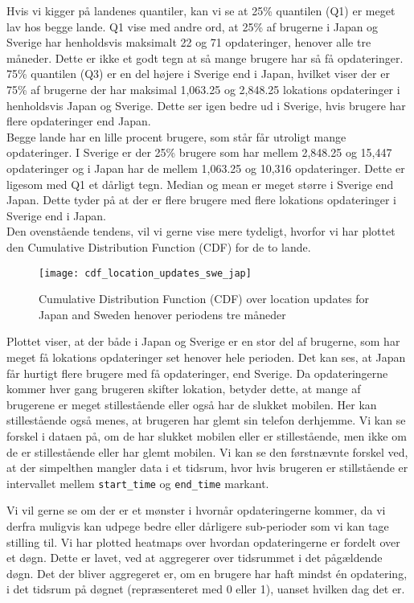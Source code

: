 Hvis vi kigger på landenes quantiler, kan vi se at 25\% quantilen (Q1) er meget lav hos begge lande. Q1 vise med andre ord, at 25\% af brugerne i Japan og Sverige har henholdsvis maksimalt 22 og 71 opdateringer, henover alle tre måneder. Dette er ikke et godt tegn at så mange brugere har så få opdateringer. 75\% quantilen (Q3) er en del højere i Sverige end i Japan, hvilket viser der er 75\% af brugerne der har maksimal 1,063.25 og 2,848.25 lokations opdateringer i henholdsvis Japan og Sverige. Dette ser igen bedre ud i Sverige, hvis brugere har flere opdateringer end Japan. \\ 

Begge lande har en lille procent brugere, som står får utroligt mange opdateringer. I Sverige er der 25\% brugere som har mellem 2,848.25 og 15,447 opdateringer og i Japan har de mellem 1,063.25 og 10,316 opdateringer. Dette er ligesom med Q1 et dårligt tegn. 
Median og mean er meget større i Sverige end Japan. Dette tyder på at der er flere brugere med flere lokations opdateringer i Sverige end i Japan. \\


Den ovenstående tendens, vil vi gerne vise mere tydeligt, hvorfor vi har plottet den Cumulative Distribution Function (CDF) for de to lande. 
\begin{figure}[H]
    \hspace*{-1.0cm}
    \centering
    \texttt{[image: cdf\_location\_updates\_swe\_jap]}
    \caption{Cumulative Distribution Function (CDF) over location updates for Japan and Sweden henover periodens tre måneder}
    \label{fig:country_cdf}
\end{figure}

Plottet viser, at der både i Japan og Sverige er en stor del af brugerne, som har meget få lokations opdateringer set henover hele perioden. Det kan ses, at Japan får hurtigt flere brugere med få opdateringer, end Sverige. 
Da opdateringerne kommer hver gang brugeren skifter lokation, betyder dette, at mange af brugerene er meget stillestående eller også har de slukket mobilen. Her kan stillestående også menes, at brugeren har glemt sin telefon derhjemme. Vi kan se forskel i dataen på, om de har slukket mobilen eller er stillestående, men ikke om de er stillestående eller har glemt mobilen. Vi kan se den førstnævnte forskel ved, at der simpelthen mangler data i et tidsrum, hvor hvis brugeren er stillstående er intervallet mellem \texttt{start\_time} og \texttt{end\_time} markant. 

Vi vil gerne se om der er et mønster i hvornår opdateringerne kommer, da vi derfra muligvis kan udpege bedre eller dårligere sub-perioder som vi kan tage stilling til.
Vi har plotted heatmaps over hvordan opdateringerne er fordelt over et døgn. Dette er lavet, ved at aggregerer over tidsrummet i det pågældende døgn. Det der bliver aggregeret er, om en brugere har haft mindst én opdatering, i det tidsrum på døgnet (repræsenteret med 0 eller 1), uanset hvilken dag det er.

